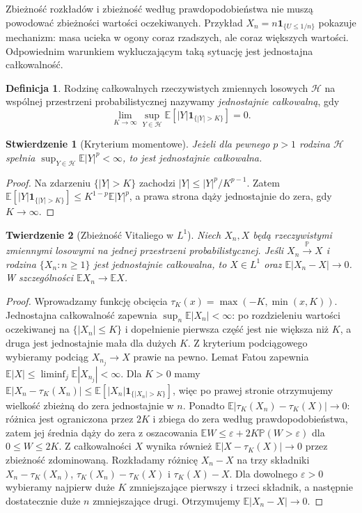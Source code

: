 \documentclass[11pt,a4paper,oneside]{report}
\numberwithin{equation}{chapter}
\theoremstyle{plain}
\newtheorem{twierdzenie}{Twierdzenie}[chapter]
\newtheorem{stwierdzenie}[twierdzenie]{Stwierdzenie}
\theoremstyle{definition}
\newtheorem{definicja}{Definicja}[chapter]
\theoremstyle{remark}
\newcommand{\Prob}{\mathbb{P}}
\newcommand{\E}{\mathbb{E}}
\newcommand{\ind}[1]{\mathbf{1}_{#1}}
\begin{document}
Zbieżność rozkładów i zbieżność według prawdopodobieństwa
nie muszą powodować zbieżności wartości oczekiwanych.
Przykład $X_n=n\ind{\{U\leq1/n\}}$ pokazuje mechanizm:
masa ucieka w ogony coraz rzadszych, ale coraz
większych wartości. Odpowiednim warunkiem wykluczającym
taką sytuację jest jednostajna całkowalność.

\begin{definicja}
Rodzinę całkowalnych rzeczywistych zmiennych losowych
$\mathcal H$ na wspólnej przestrzeni probabilistycznej
nazywamy \emph{jednostajnie całkowalną}, gdy
\[
\lim_{K\to\infty}\sup_{Y\in\mathcal H}
\E[|Y|\ind{\{|Y|>K\}}]=0.
\]
\end{definicja}

\begin{stwierdzenie}[Kryterium momentowe]
Jeżeli dla pewnego $p>1$ rodzina $\mathcal H$ spełnia
$\sup_{Y\in\mathcal H}\E|Y|^p<\infty$,
to jest jednostajnie całkowalna.
\end{stwierdzenie}
\begin{proof}
Na zdarzeniu $\{|Y|>K\}$ zachodzi
$|Y|\leq |Y|^p/K^{p-1}$. Zatem
$\E[|Y|\ind{\{|Y|>K\}}]
\leq K^{1-p}\E|Y|^p$, a prawa strona dąży
jednostajnie do zera, gdy $K\to\infty$.
\end{proof}

\begin{twierdzenie}[Zbieżność Vitaliego w $L^1$]
Niech $X_n,X$ będą rzeczywistymi zmiennymi losowymi
na jednej przestrzeni probabilistycznej.
Jeśli $X_n\xrightarrow{\Prob}X$ i rodzina
$\{X_n:n\geq1\}$ jest jednostajnie całkowalna,
to $X\in L^1$ oraz $\E|X_n-X|\to0$.
W szczególności $\E X_n\to\E X$.
\end{twierdzenie}
\begin{proof}
Wprowadzamy funkcję obcięcia
$\tau_K(x)=\max(-K,\min(x,K))$.
Jednostajna całkowalność zapewnia
$\sup_n\E|X_n|<\infty$: po rozdzieleniu wartości
oczekiwanej na $\{|X_n|\leq K\}$ i dopełnienie
pierwsza część jest nie większa niż $K$, a druga
jest jednostajnie mała dla dużych $K$.
Z kryterium podciągowego wybieramy podciąg
$X_{n_j}\to X$ prawie na pewno. Lemat Fatou
zapewnia $\E|X|\leq\liminf_j\E|X_{n_j}|<\infty$.
Dla $K>0$
mamy $\E|X_n-\tau_K(X_n)|\leq
\E[|X_n|\ind{\{|X_n|>K\}}]$, więc
po prawej stronie otrzymujemy wielkość zbieżną do
zera jednostajnie w $n$. Ponadto
$\E|\tau_K(X_n)-\tau_K(X)|\to0$:
różnica jest ograniczona przez $2K$ i zbiega do zera
według prawdopodobieństwa, zatem jej średnia dąży
do zera z oszacowania
$\E W\leq\varepsilon+2K\Prob(W>\varepsilon)$
dla $0\leq W\leq2K$.
Z całkowalności $X$ wynika również
$\E|X-\tau_K(X)|\to0$ przez zbieżność zdominowaną.
Rozkładamy różnicę $X_n-X$ na trzy składniki
$X_n-\tau_K(X_n)$,
$\tau_K(X_n)-\tau_K(X)$ i
$\tau_K(X)-X$. Dla dowolnego $\varepsilon>0$
wybieramy najpierw duże $K$ zmniejszające pierwszy
i trzeci składnik, a następnie dostatecznie duże $n$
zmniejszające drugi. Otrzymujemy $\E|X_n-X|\to0$.
\end{proof}
\end{document}
